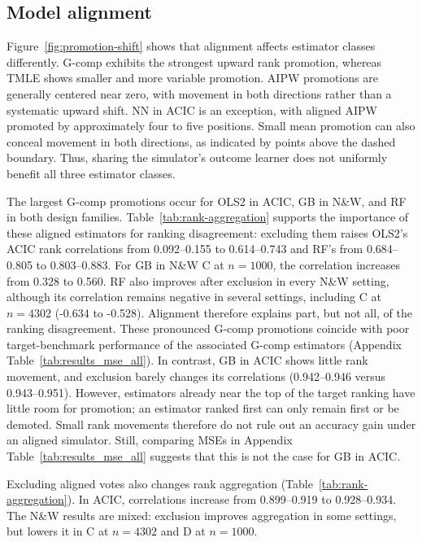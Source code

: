 \subsection{Model alignment}

Figure~\ref{fig:promotion-shift} shows that alignment affects estimator classes differently. G-comp exhibits the strongest upward rank promotion, whereas TMLE shows smaller and more variable promotion. AIPW promotions are generally centered near zero, with movement in both directions rather than a systematic upward shift. NN in ACIC is an exception, with aligned AIPW promoted by approximately four to five positions. Small mean promotion can also conceal movement in both directions, as indicated by points above the dashed boundary. Thus, sharing the simulator's outcome learner does not uniformly benefit all three estimator classes.

The largest G-comp promotions occur for OLS2 in ACIC, GB in N\&W, and RF in both design families. Table~\ref{tab:rank-aggregation} supports the importance of these aligned estimators for ranking disagreement: excluding them raises OLS2's ACIC rank correlations from 0.092--0.155 to 0.614--0.743 and RF's from 0.684--0.805 to 0.803--0.883. For GB in N\&W C at \(n=1000\), the correlation increases from 0.328 to 0.560. RF also improves after exclusion in every N\&W setting, although its correlation remains negative in several settings, including C at \(n=4302\) (-0.634 to -0.528). Alignment therefore explains part, but not all, of the ranking disagreement. These pronounced G-comp promotions coincide with poor target-benchmark performance of the associated G-comp estimators (Appendix Table~\ref{tab:results_mse_all}). In contrast, GB in ACIC shows little rank movement, and exclusion barely changes its correlations (0.942--0.946 versus 0.943--0.951). However, estimators already near the top of the target ranking have little room for promotion; an estimator ranked first can only remain first or be demoted. Small rank movements therefore do not rule out an accuracy gain under an aligned simulator. Still, comparing MSEs in Appendix Table~\ref{tab:results_mse_all} suggests that this is not the case for GB in ACIC.

Excluding aligned votes also changes rank aggregation (Table~\ref{tab:rank-aggregation}). In ACIC, correlations increase from 0.899--0.919 to 0.928--0.934. The N\&W results are mixed: exclusion improves aggregation in some settings, but lowers it in C at \(n=4302\) and D at \(n=1000\).


